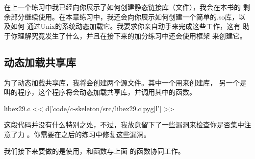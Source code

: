 在上一个练习中我已经向你展示了如何创建静态链接库（文件），我会在本书的
剩余部分继续使用。在本章练习中，我还会向你展示如何创建一个简单的.so库，以及如何
通过Unix的系统动态加载它。我要求你亲自动手来完成这些工作，这有
助于你理解究竟发生了什么，并且在接下来的加分练习中还会使用框架
来创建它。

\subsection{动态加载共享库}

为了动态加载共享库，我将会创建两个源文件。其中一个用来创建库，
另一个是叫的程序，这个程序将会动态加载共享库，并调用其中的函数。

\begin{code}{libex29.c}
<< d['code/c-skeleton/src/libex29.c|pyg|l'] >>
\end{code}

这段代码并没有什么特别之处，不过，我故意留下了一些漏洞来检查你是否集中注意了力
。你需要在之后的练习中修复这些漏洞。

我们接下来要做的是使用，和函数与上面
的函数协同工作。

